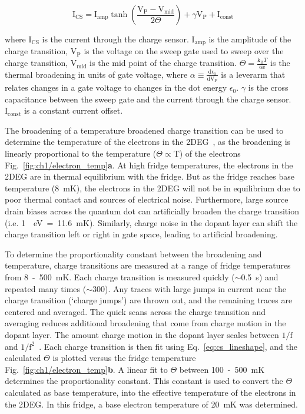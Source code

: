 \begin{equation}\label{eq:cs_lineshape}
 \mathrm{I_{CS}} = 
 \mathrm{I_{amp}}
 \tanh
 \left( 
 \frac{\mathrm{V_P - V_{mid}}}{2\Theta}
 \right) + 
 \gamma \mathrm{V_P}
 + \mathrm{I_{const}}
\end{equation}

where $\mathrm{I_{CS}}$ is the current through the charge sensor. $\mathrm{I_{amp}}$ is the amplitude of the charge transition, $\mathrm{V_{P}}$ is the voltage on the sweep gate used to sweep over the charge transition, $\mathrm{V_{mid}}$ is the mid point of the charge transition. $\Theta=\frac{\mathrm{k_B}T}{\mathrm{\alpha e}}$ is the thermal broadening in units of gate voltage, where $\alpha \equiv \frac{\mathrm{d\epsilon_0}}{\mathrm{dV_P}}$ is a leverarm that relates changes in a gate voltage to changes in the dot energy $\epsilon_0$. $\gamma$ is the cross capacitance between the sweep gate and the current through the charge sensor. $\mathrm{I_{const}}$ is a constant current offset.



The broadening of a temperature broadened charge transition can be used to determine the temperature of the electrons in the 2DEG~\cite{cs_measure_temp}, as the broadening is linearly proportional to the temperature ($\Theta\propto\mathrm{T}$) of the electrons Fig.~\ref{fig:ch1/electron_temp}\textbf{a}. At high fridge temperatures, the electrons in the 2DEG are in thermal equilibrium with the fridge. But as the fridge reaches base temperature (\qty{8}{mK}), the electrons in the 2DEG will not be in equilibrium due to poor thermal contact and sources of electrical noise. Furthermore, large source drain biases across the quantum dot can artificially broaden the charge transition (i.e. \qty{1}{\mu eV}~=~\qty{11.6}{mK}). Similarly, charge noise in the dopant layer can shift the charge transition left or right in gate space, leading to artificial broadening. 


To determine the proportionality constant between the broadening and temperature, charge transitions are measured at a range of fridge temperatures from \qty{8}{}~-~\qty{500}{mK}. Each charge transition is measured quickly ($\sim$\qty{0.5}{s}) and repeated many times ($\sim300$). Any traces with large jumps in current near the charge transition (`charge jumps') are thrown out, and the remaining traces are centered and averaged. The quick scans across the charge transition and averaging reduces additional broadening that come from charge motion in the dopant layer. The amount charge motion in the dopant layer scales between $\mathrm{1/f}$ and $\mathrm{1/f^2}$~\cite{charge_noise}. Each charge transition is then fit using Eq.~\ref{eq:cs_lineshape}, and the calculated $\Theta$ is plotted versus the fridge temperature Fig.~\ref{fig:ch1/electron_temp}\textbf{b}. A linear fit to $\Theta$ between \qty{100}{}~-~\qty{500}{mK} determines the proportionality constant. This constant is used to convert the $\Theta$ calculated as base temperature, into the effective temperature of the electrons in the 2DEG. In this fridge, a base electron temperature of \qty{20}{mK} was determined.



